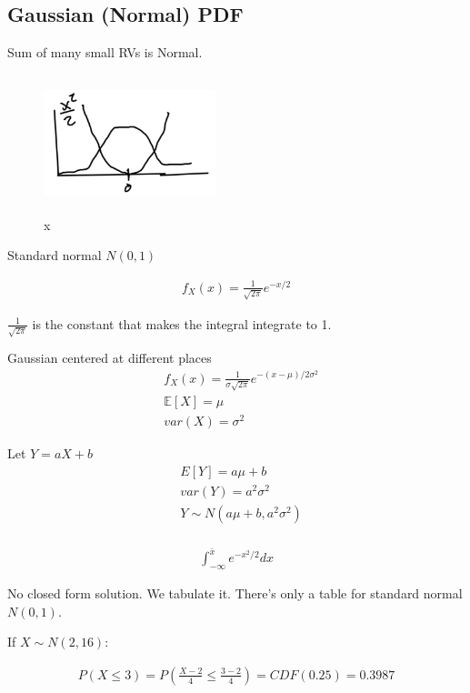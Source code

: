 \documentclass{article}
\begin{document}
\subsection{Gaussian (Normal) PDF}


Sum of many small RVs is Normal.

\begin{figure}[h]
\centering
\includegraphics[width=5cm, height=4cm]{images/L08/gaussian_pdf.jpeg}
\caption{x}
\end{figure}

Standard normal $N(0,1)$

\begin{align*}
f_X(x) = \frac{1}{\sqrt{2\pi}} e^{-x/2}
\end{align*}

$\frac{1}{\sqrt{2\pi}}$ is the constant that makes the integral integrate to 1.

Gaussian centered at different places
\begin{align*}
&f_X(x) = \frac{1}{\sigma\sqrt{2\pi}} e^{-(x-\mu)/2\sigma^2}\\
&\mathbb{E}[X]=\mu \\
&var(X)= \sigma^2
\end{align*}

Let $Y=aX+b$
\begin{align*}
&E[Y]=a\mu+b\\
&var(Y)= a^2 \sigma^2\\
&Y \sim N(a\mu+b, a^2 \sigma^2)\\
\end{align*}


\begin{align*}
\int_{-\infty}^{\bar{x}} e^{-x^2/2}dx
\end{align*}

No closed form solution.  We tabulate it.  There's only a table for standard normal $N(0,1)$.

If $X \sim N(2,16)$:

\begin{align*}
P(X \le 3) = P\left( \frac{X-2}{4} \le \frac{3-2}{4} \right) = CDF(0.25)=0.3987
\end{align*}
\end{document}
